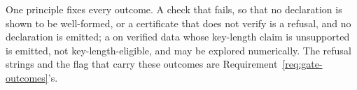 
One principle fixes every outcome. A check that fails, so that no declaration
is shown to be well-formed, or a certificate that does not verify is a
refusal, and no declaration is emitted; a  on
verified data whose key-length claim is unsupported is emitted, not
key-length-eligible, and may be explored numerically. The refusal strings and
the flag that carry these outcomes are Requirement~\ref{req:gate-outcomes}'s.

